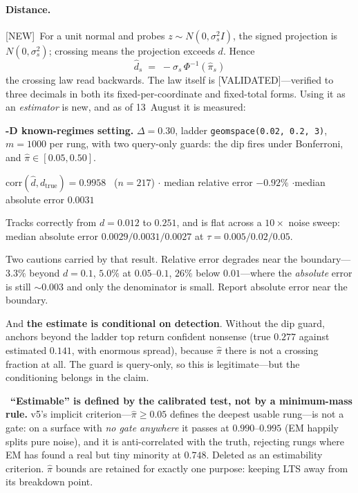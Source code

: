 \documentclass[11pt]{article}
\newcommand{\dhat}{\hat{d}}
\newcommand{\pihat}{\hat{\pi}}
\newcommand{\provtag}[2]{{\footnotesize\sffamily\textcolor{#1}{[#2]}}}
\newcommand{\VALID}{\provtag{okgreen}{VALIDATED}}
\newcommand{\NEWT}{\provtag{newmag}{NEW}}
\newcommand{\REVI}{\provtag{openamber}{REVISED 14--15 AUG}}
\begin{document}
\paragraph{Distance.} \NEWT\ For a unit normal and probes $z \sim N(0,\sigma_s^2 I)$, the signed
projection is $N(0,\sigma_s^2)$; crossing means the projection exceeds $d$. Hence
\[
  \boxed{\;\dhat_s \;=\; -\sigma_s\,\Phi^{-1}(\pihat_s)\;}
\]
the crossing law read backwards. The law itself is \VALID---verified to three decimals in both its
fixed-per-coordinate and fixed-total forms. Using it as an \emph{estimator} is new, and as of
13~August it is measured:

\begin{resultbox}
\noindent\textbf{-D known-regimes setting.} $\Delta = 0.30$, ladder
\texttt{geomspace(0.02, 0.2, 3)}, $m = 1000$ per rung, with two query-only guards: the dip fires
under Bonferroni, and $\pihat \in [0.05, 0.50]$.

\smallskip
\noindent $\mathrm{corr}(\dhat, d_{\text{true}}) = \mathbf{0.9958}$ \, ($n = 217$) \quad$\cdot$\quad
median relative error $\mathbf{-0.92\%}$ \quad$\cdot$\quad median absolute error $0.0031$

\smallskip
\noindent Tracks correctly from $d = 0.012$ to $0.251$, and is flat across a $10\times$ noise
sweep: median absolute error $0.0029 / 0.0031 / 0.0027$ at $\tau = 0.005 / 0.02 / 0.05$.
\end{resultbox}

Two cautions carried by that result. Relative error degrades near the boundary---$3.3\%$ beyond
$d = 0.1$, $5.0\%$ at $0.05$--$0.1$, $26\%$ below $0.01$---where the \emph{absolute} error is
still $\sim\!0.003$ and only the denominator is small. Report absolute error near the boundary.

And \textbf{the estimate is conditional on detection}. Without the dip guard, anchors beyond the
ladder top return confident nonsense (true $0.277$ against estimated $0.141$, with enormous
spread), because $\pihat$ there is not a crossing fraction at all. The guard is query-only, so
this is legitimate---but the conditioning belongs in the claim.

\smallskip
\noindent\REVI\ \textbf{``Estimable'' is defined by the calibrated test, not by a minimum-mass
rule.} v5's implicit criterion---$\pihat \ge 0.05$ defines the deepest usable rung---is not a
gate: on a surface with \emph{no gate anywhere} it passes at $0.990$--$0.995$ (EM happily splits
pure noise), and it is anti-correlated with the truth, rejecting rungs where EM has found a real
but tiny minority at $0.748$. Deleted as an estimability criterion. $\pihat$ bounds are retained
for exactly one purpose: keeping LTS away from its breakdown point.
\end{document}
